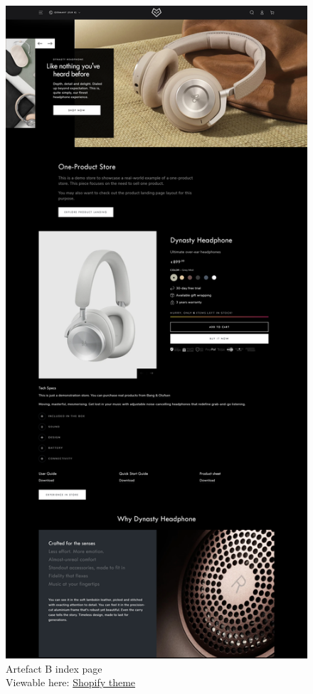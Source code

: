 \documentclass[article]{IEEEtran}
\begin{document}
            \begin{figure}[H]
                \caption{Artefact B index page \\\hspace{\textwidth} Viewable here: \href{https://beyours-theme-tech.myshopify.com/}{Shopify theme}}
                \includegraphics[width=\columnwidth]{images/artefact/artefact-b-fullpage.png}
            \end{figure}
\end{document}
